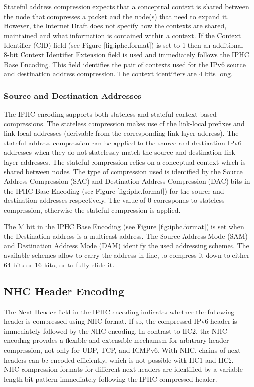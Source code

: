 \documentclass[12pt, titlepage, a4paper]{report}
\begin{document}
Stateful address compression expects that a conceptual context is shared between the node that compresses a packet and the node(s) that need to expand it.  However, the Internet Draft \cite{draft-hc-06} does not specify how the contexts are shared, maintained and what information is contained within a context. If the Context Identifier (CID) field (see Figure \ref{fig:iphc.format}) is set to 1 then an additional 8-bit Context Identifier Extension field is used and immediately follows the IPHC Base Encoding. This field identifies the pair of contexts used for the IPv6 source and destination address compression. The context identifiers are 4 bits long.

\subsubsection{Source and Destination Addresses}
The IPHC encoding supports both stateless and stateful context-based compressions. The stateless compression makes use of the link-local prefixes and link-local addresses (derivable from the corresponding link-layer address). The stateful address compression can be applied to the source and destination IPv6 addresses when they do not statelessly match the source and destination link layer addresses. The stateful compression relies on a conceptual context which is shared between nodes. The type of compression used is identified by the Source Address Compression (SAC) and Destination Address Compression (DAC) bits in the IPHC Base Encoding (see Figure \ref{fig:iphc.format}) for the source and destination addresses respectively. The value of 0 corresponds to stateless compression, otherwise the stateful compression is applied.

The M bit in the IPHC Base Encoding (see Figure \ref{fig:iphc.format}) is set when the Destination address is a multicast address. The Source Address Mode (SAM) and Destination Address Mode (DAM) identify the used addressing schemes. The available schemes allow to carry the address in-line, to compress it down to either 64 bits or 16 bits, or to fully elide it.

\subsection{NHC Header Encoding}\label{sec:nhc}
The Next Header field in the IPHC encoding indicates whether the following header is compressed using NHC format.  If so, the compressed IPv6 header is immediately followed by the NHC encoding. In contrast to HC2, the NHC encoding provides a flexible and extensible mechanism for arbitrary header compression, not only for UDP, TCP, and ICMPv6. With NHC, chains of next headers can be encoded efficiently, which is not possible with HC1 and HC2. NHC compression formats for different next headers are identified by a variable-length bit-pattern immediately following the IPHC compressed header. 
\end{document}
